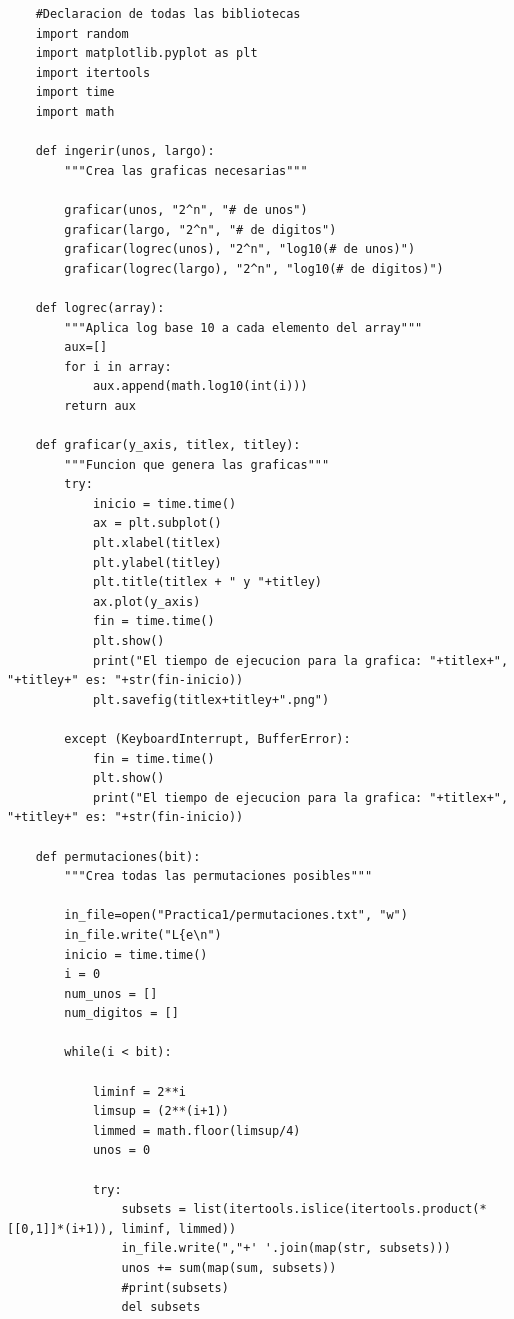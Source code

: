 \documentclass{article}
\begin{document}
\begin{lstlisting}
    #Declaracion de todas las bibliotecas
    import random
    import matplotlib.pyplot as plt
    import itertools
    import time
    import math
    
    def ingerir(unos, largo):
        """Crea las graficas necesarias"""
        
        graficar(unos, "2^n", "# de unos")
        graficar(largo, "2^n", "# de digitos")
        graficar(logrec(unos), "2^n", "log10(# de unos)")
        graficar(logrec(largo), "2^n", "log10(# de digitos)")
        
    def logrec(array):
        """Aplica log base 10 a cada elemento del array"""
        aux=[]
        for i in array:
            aux.append(math.log10(int(i)))
        return aux
    
    def graficar(y_axis, titlex, titley):
        """Funcion que genera las graficas"""
        try:
            inicio = time.time()
            ax = plt.subplot()
            plt.xlabel(titlex)
            plt.ylabel(titley)
            plt.title(titlex + " y "+titley)
            ax.plot(y_axis)
            fin = time.time()
            plt.show()
            print("El tiempo de ejecucion para la grafica: "+titlex+", "+titley+" es: "+str(fin-inicio))
            plt.savefig(titlex+titley+".png")
            
        except (KeyboardInterrupt, BufferError):
            fin = time.time()
            plt.show()
            print("El tiempo de ejecucion para la grafica: "+titlex+", "+titley+" es: "+str(fin-inicio))
        
    def permutaciones(bit):
        """Crea todas las permutaciones posibles"""
        
        in_file=open("Practica1/permutaciones.txt", "w")
        in_file.write("L{e\n")
        inicio = time.time()
        i = 0
        num_unos = []
        num_digitos = []
        
        while(i < bit):
            
            liminf = 2**i
            limsup = (2**(i+1))
            limmed = math.floor(limsup/4)
            unos = 0
            
            try:
                subsets = list(itertools.islice(itertools.product(*[[0,1]]*(i+1)), liminf, limmed))
                in_file.write(","+' '.join(map(str, subsets)))
                unos += sum(map(sum, subsets))
                #print(subsets)
                del subsets
                

\end{lstlisting}
\end{document}
